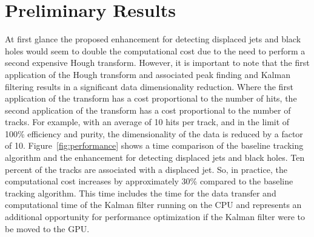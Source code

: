 \documentclass{JINST}
\begin{document}
\section{Preliminary Results}

At first glance the proposed enhancement for detecting displaced jets and black holes would seem to double the computational cost due to the need to perform a second expensive Hough transform.  However, it is important to note that the first application of the Hough transform and associated peak finding and Kalman filtering results in a significant data dimensionality reduction.  Where the first application of the transform has a cost proportional to the number of hits, the second application of the transform has a cost proportional to the number of tracks.  For example, with an average of 10 hits per track, and in the limit of 100\% efficiency and purity, the dimensionality of the data is reduced by a factor of 10.  Figure~\ref{fig:performance} shows a time comparison of the baseline tracking algorithm and the enhancement for detecting displaced jets and black holes.  Ten percent of the tracks are associated with a displaced jet.  So, in practice, the computational cost increases by approximately 30\% compared to the baseline tracking algorithm.  This time includes the time for the data transfer and computational time of the Kalman filter running on the CPU and represents an additional opportunity for performance optimization if the Kalman filter were to be moved to the GPU.
\end{document}
